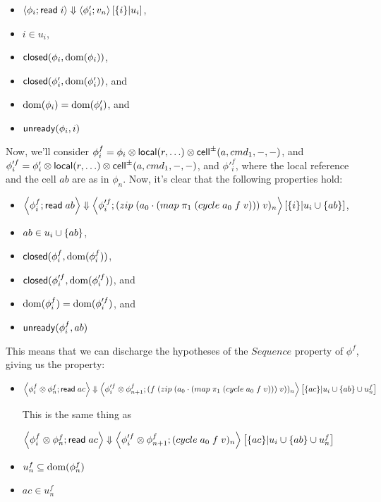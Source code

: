 \documentclass{article}
\begin{document}
\begin{itemize}
\item $\left<{\phi_i};{\mbox{\textsf{{read}}}\; i}\right>\Downarrow\left<{\phi'_i};{v_n}\right>\left[{\{{i}\}}|{u_i}\right]$, 
\item $i \in u_i$, 
\item $\mbox{\textsf{{closed}}}({\phi_i}, {\mbox{dom}({\phi_i})})$,
\item $\mbox{\textsf{{closed}}}({\phi'_i}, {\mbox{dom}({\phi'_i})})$, and
\item $\mbox{dom}({\phi_i}) = \mbox{dom}({\phi'_i})$, and
\item $\mbox{\textsf{{unready}}}({\phi_i}, {i})$
\end{itemize}

Now, we'll consider $\phi^f_i = \phi_i \otimes \mbox{\textsf{{local}}}({r}, {\ldots}) \otimes \mbox{\textsf{{cell}}}^{\pm}({a}, {cmd_1}, {-}, {-})$, and $\phi'^f_i = \phi'_i \otimes \mbox{\textsf{{local}}}({r}, {\ldots}) \otimes \mbox{\textsf{{cell}}}^{\pm}({a}, {cmd_1}, {-}, {-})$, and $\phi'^f_i$, where the local reference and the cell $ab$ are as in $\phi_n$. Now, it's clear that the
following properties hold: 

\begin{itemize}
\item $\left<{\phi^f_i};{\mbox{\textsf{{read}}}\; ab}\right>\Downarrow\left<{\phi'^f_i};{(zip\;(a_0\cdot(map\;\pi_1\;(cycle\;a_0\;f\;v)))\;v)_n}\right>\left[{\{{i}\}}|{u_i \cup \{{ab}\}}\right]$, 
\item $ab \in u_i \cup \{{ab}\}$, 
\item $\mbox{\textsf{{closed}}}({\phi^f_i}, {\mbox{dom}({\phi^f_i})})$,
\item $\mbox{\textsf{{closed}}}({\phi'^f_i}, {\mbox{dom}({\phi'^f_i})})$, and
\item $\mbox{dom}({\phi^f_i}) = \mbox{dom}({\phi'^f_i})$, and
\item $\mbox{\textsf{{unready}}}({\phi^f_i}, {ab})$
\end{itemize}

This means that we can discharge the hypotheses of the $Sequence$ property of $\phi^f$, giving
us the property: 

\begin{itemize}
\item $\left<{\phi^f_i \otimes \phi^f_n};{\mbox{\textsf{{read}}}\; ac}\right>\Downarrow\left<{\phi'^f_i \otimes \phi^f_{n+1}};{(f\;(zip\;(a_0\cdot(map\;\pi_1\;(cycle\;a_0\;f\;v)))\;v))_n}\right>\left[{\{{ac}\}}|{u_i \cup \{{ab}\} \cup u^f_n}\right]$

This is the same thing as 

$\left<{\phi^f_i \otimes \phi^f_n};{\mbox{\textsf{{read}}}\; ac}\right>\Downarrow\left<{\phi'^f_i \otimes \phi^f_{n+1}};{(cycle\;a_0\;f\;v)_n}\right>\left[{\{{ac}\}}|{u_i \cup \{{ab}\} \cup u^f_n}\right]$
\item $u^f_n \subseteq \mbox{dom}({\phi^f_n})$
\item $ac \in u^f_n$
\end{itemize}
\end{document}

